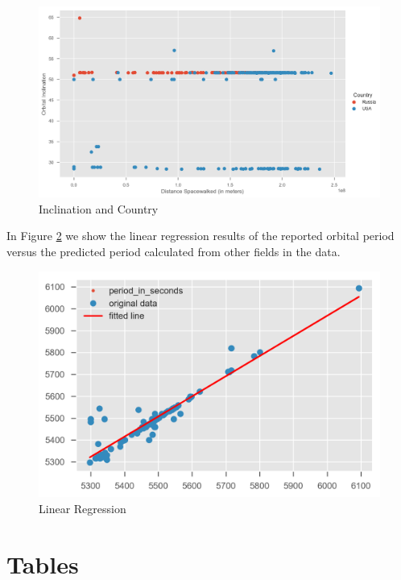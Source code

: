 \documentclass[sigconf]{acmart}
\begin{document}
\begin{figure}[p]
	\centering\includegraphics[width=\columnwidth]{images/fig3.png}
	\caption{Inclination and Country}\label{f:fig3}
\end{figure}


In Figure \ref{f:fig4} we show the linear regression results of the reported orbital period versus the predicted period calculated from other fields in the data. 

\begin{figure}[htb]
	\centering\includegraphics[width=\columnwidth]{images/fig4.png}
	\caption{Linear Regression}\label{f:fig4}
\end{figure}



\section{Tables}
\end{document}
